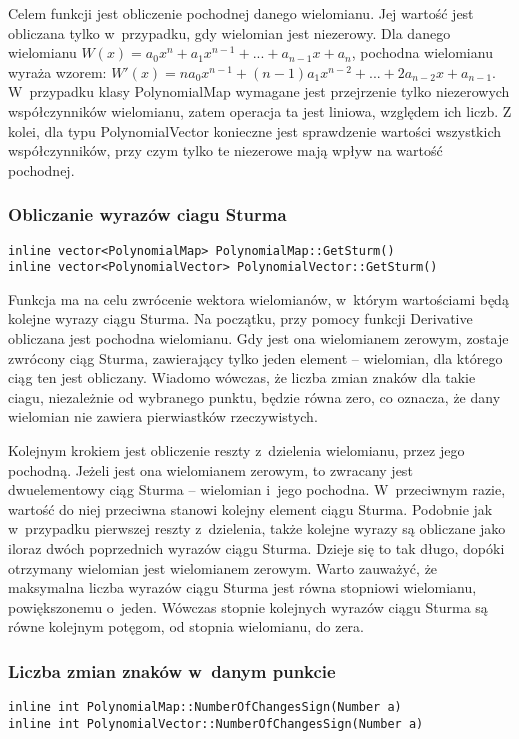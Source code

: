Celem funkcji jest obliczenie pochodnej danego wielomianu. Jej wartość jest obliczana tylko w~przypadku, gdy wielomian jest niezerowy. Dla danego wielomianu $W(x) = a_0x^n + a_1x^{n-1} + ... + a_{n-1}x + a_n$, pochodna wielomianu wyraża wzorem: $W'(x) = na_0x^{n-1} + (n-1)a_1x^{n-2} + ... + 2a_{n-2}x + a_{n-1}$. W~przypadku klasy PolynomialMap wymagane jest przejrzenie tylko niezerowych współczynników wielomianu, zatem operacja ta jest liniowa, względem ich liczb. Z kolei, dla typu PolynomialVector konieczne jest sprawdzenie wartości wszystkich współczynników, przy czym tylko te niezerowe mają wpływ na wartość pochodnej.

\subsubsection{Obliczanie wyrazów ciagu Sturma}
\begin{lstlisting}
inline vector<PolynomialMap> PolynomialMap::GetSturm()
inline vector<PolynomialVector> PolynomialVector::GetSturm()
\end{lstlisting}

Funkcja ma na celu zwrócenie wektora wielomianów, w~którym wartościami będą kolejne wyrazy ciągu Sturma. Na początku, przy pomocy funkcji Derivative obliczana jest pochodna wielomianu. Gdy jest ona wielomianem zerowym, zostaje zwrócony ciąg Sturma, zawierający tylko jeden element – wielomian, dla którego ciąg ten jest obliczany. Wiadomo wówczas, że liczba zmian znaków dla takie ciagu, niezależnie od wybranego punktu, będzie równa zero, co oznacza, że dany wielomian nie zawiera pierwiastków rzeczywistych.

Kolejnym krokiem jest obliczenie reszty z~dzielenia wielomianu, przez jego pochodną. Jeżeli jest ona wielomianem zerowym, to zwracany jest dwuelementowy ciąg Sturma – wielomian i~jego pochodna. W~przeciwnym razie, wartość do niej przeciwna stanowi kolejny element ciągu Sturma. Podobnie jak w~przypadku pierwszej reszty z~dzielenia, także kolejne wyrazy są obliczane jako iloraz dwóch poprzednich wyrazów ciągu Sturma. Dzieje się to tak długo, dopóki otrzymany wielomian jest wielomianem zerowym. Warto zauważyć, że maksymalna liczba wyrazów ciągu Sturma jest równa stopniowi wielomianu, powiększonemu o~jeden. Wówczas stopnie kolejnych wyrazów ciągu Sturma są równe kolejnym potęgom, od stopnia wielomianu, do zera.

\subsubsection{Liczba zmian znaków w~danym punkcie}
\begin{lstlisting}
inline int PolynomialMap::NumberOfChangesSign(Number a)
inline int PolynomialVector::NumberOfChangesSign(Number a)
\end{lstlisting}

